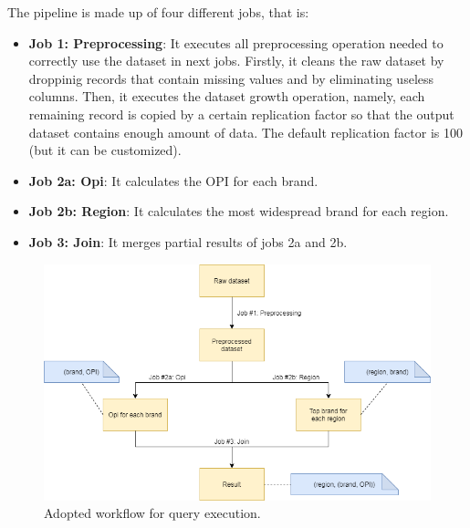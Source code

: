 The pipeline is made up of four different jobs, that is:
\begin{itemize}
  \item \textbf{Job 1: Preprocessing}: It executes all preprocessing operation needed to correctly use the dataset in next jobs. Firstly, it cleans the raw dataset by droppinig records that contain missing values and by eliminating useless columns. Then, it executes the dataset growth operation, namely, each remaining record is copied by a certain replication factor so that the output dataset contains enough amount of data. The default replication factor is 100 (but it can be customized).  
  \item \textbf{Job 2a: Opi}: It calculates the OPI for each brand.
  \item \textbf{Job 2b: Region}: It calculates the most widespread brand for each region.
  \item \textbf{Job 3: Join}: It merges partial results of jobs 2a and 2b.
\end{itemize}

\begin{figure}[H]
	\centering
	\includegraphics[scale=0.6]{images/2-mapreduce/MR-workflow.png}
	\caption{Adopted workflow for query execution.}
	\label{fig:MR-workflow}
\end{figure}



